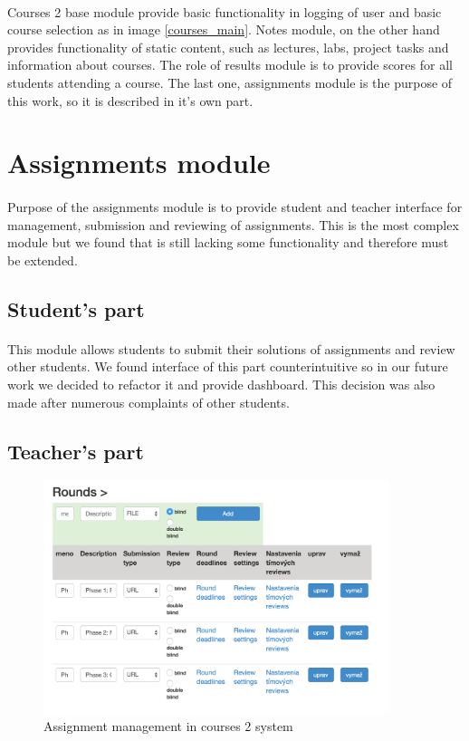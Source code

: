 \paragraph{}
Courses 2 base module provide basic functionality in logging of user and basic course selection as in image \ref{courses_main}. Notes module, on the other hand provides functionality of static content, such as lectures, labs, project tasks and information about courses. The role of results module is to provide scores for all students attending a course. The last one, assignments module is the purpose of this work, so it is described in it's own part.

\section{Assignments module}
\paragraph{}
Purpose of the assignments module is to provide student and teacher interface for management, submission and reviewing of assignments. This is the most complex module but we found that is still lacking some functionality and therefore must be extended.

\subsection{Student's part}
\paragraph{}
This module allows students to submit their solutions of assignments and review other students. We found interface of this part counterintuitive so in our future work we decided to refactor it and provide dashboard. This decision was also made after numerous complaints of other students.

\subsection{Teacher's part}


\begin{figure}[h]
    \centering
    \includegraphics[width=0.9\textwidth]{courses/rounds.png}
    \caption{Assignment management in courses 2 system}
    \label{courses_assignment_admin}
\end{figure}


